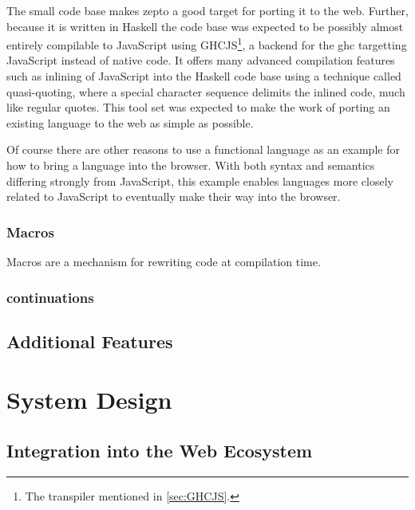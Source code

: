 \documentclass[oneside,11pt,xetex]{scrbook}
\begin{document}
The small code base makes zepto a good target for porting it to the web. Further, because it
is written in Haskell the code base was expected to be possibly almost entirely compilable
to JavaScript using GHCJS\footnote{The transpiler mentioned in \ref{sec:GHCJS}.}, a backend
for the \gls{ghc} targetting JavaScript instead of native code. It offers many advanced
compilation features such as inlining of JavaScript into the Haskell code
base using a technique called quasi-quoting, where a special character sequence delimits the
inlined code, much like regular quotes. This tool set was expected to make the work of porting
an existing language to the web as simple as possible.

Of course there are other reasons to use a functional language as an example for how to
bring a language into the browser. With both syntax
and semantics differing strongly from JavaScript, this example enables  languages more
closely related to JavaScript to eventually make their way into the browser.

\subsection{Macros}
\label{macro}

Macros are a mechanism for rewriting code at compilation time. 

\subsection{continuations}
\label{continuation}

\section{Additional Features}


\chapter{System Design}
\label{chap:SystemDesign}

\section{Integration into the Web Ecosystem}


\end{document}
